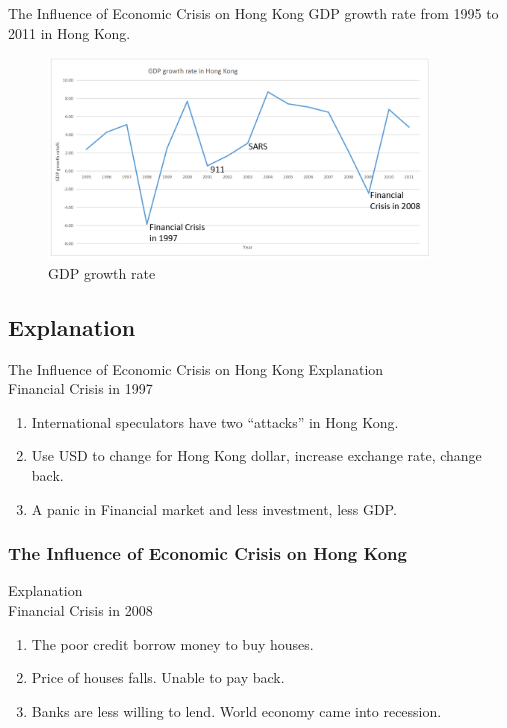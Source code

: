 \documentclass[slidestop,uncompress,mathsans, 12pt]{beamer}
\begin{document}
\begin{frame}{The Influence of Economic Crisis on Hong Kong }
GDP growth rate from 1995 to 2011 in Hong Kong.\\
\bigskip
\begin{figure}[h]
\raggedleft
\includegraphics[width=0.9\textwidth]{hk23.png}
\caption{GDP growth rate}
\label{threadsVsSync}
\end{figure}
\end{frame}

\subsection{Explanation}
\begin{frame}{The Influence of Economic Crisis on Hong Kong }
Explanation\\
\bigskip
\alert{Financial Crisis in 1997}
\bigskip

\begin{enumerate}[i]
\pause\item International speculators have two “attacks” in Hong Kong.
\bigskip
\pause\item Use USD to change for Hong Kong dollar, increase exchange rate, change back.
\bigskip
\pause\item A panic in Financial market and less investment, less GDP.
\end{enumerate}

\end{frame}

\begin{frame}
\frametitle{The Influence of Economic Crisis on Hong Kong }
Explanation\\
\bigskip
\alert{Financial Crisis in 2008}
\bigskip
\begin{enumerate}[I]
\item <+-| alert@+> The poor credit borrow money to buy houses.

\bigskip
\item <+-| alert@+> Price of houses falls. Unable to pay back.

\bigskip
\item <+-| alert@+> Banks are less willing to lend. World economy came into recession.


\bigskip

\end{enumerate}
\end{frame}
\end{document}
